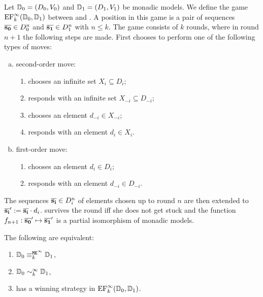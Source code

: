 \begin{definition}
Let $\mathbb{D}_0 = (D_0,V_0)$ and $\mathbb{D}_1 = (D_1,V_1)$ be monadic models. 
We define the game $\mathrm{EF}^\infty_k(\mathbb{D}_0,\mathbb{D}_1)$ between \abelard
and \eloise. 
A position in this game is a pair of sequences $\overline{{\mathbf{s_0}}} \in D_0^n$ and
$\overline{{\mathbf{s_1}}} \in D_1^n$ with $n \leq k$. 
The game consists of $k$ rounds, where in round $n+1$ the following steps are 
made. First \abelard chooses to perform one of the following types of moves:
%
\begin{enumerate}[(a)]
 pt  pt  pt  pt%
\item second-order move:
\begin{enumerate}[1.]
 pt  pt  pt  pt  pt%
\item \abelard chooses an infinite set $X_i \subseteq D_i$;
\item \eloise responds with an infinite set $X_{-i} \subseteq D_{-i}$;
\item \abelard chooses an element $d_{-i} \in X_{-i}$;
\item \eloise responds with an element $d_i \in X_i$.
\end{enumerate}
%
\item first-order move:
\begin{enumerate}[1.]
 pt
 pt
\item \abelard chooses an element $d_i \in D_i$;
\item \eloise responds with an element $d_{-i} \in D_{-i}$.
\end{enumerate}
\end{enumerate}
%
The sequences $\overline{{\mathbf{s_i}}} \in D_i^n$ of elements chosen up to round $n$ are 
then extended to ${\overline{{\mathbf{s_i}}}' \mathrel{:=}  \overline{{\mathbf{s_i}}}\cdot d_i}$. 
\eloise survives the round iff she does not get stuck and the function $f_{n+1}:
\overline{{\mathbf{s_0}}}' \mapsto \overline{{\mathbf{s_1}}}'$ is a partial isomorphism of monadic models.
\end{definition}


\begin{proposition}\label{prop:connolque}
The following are equivalent:
\begin{enumerate}
 pt
\item\label{prop:connolque:i} 
$\mathbb{D}_0 \equiv_k^{\mathtt{M}\mathtt{E}^{\infty}} \mathbb{D}_1$,
\item\label{prop:connolque:ii}
$\mathbb{D}_0 \sim_k^\infty \mathbb{D}_1$,
\item\label{prop:connolque:iii}
\eloise has a winning strategy in $\mathrm{EF}_k^\infty(\mathbb{D}_0,\mathbb{D}_1)$.
\end{enumerate}
\end{proposition}

